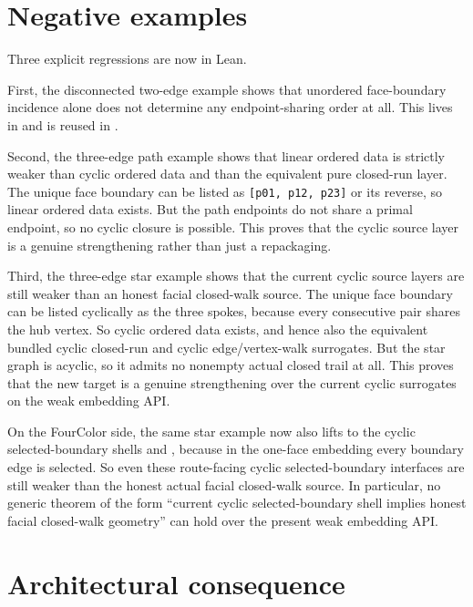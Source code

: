 \documentclass[11pt]{article}
\begin{document}
\section{Negative examples}

Three explicit regressions are now in Lean.

First, the disconnected two-edge example shows that unordered face-boundary
incidence alone does not determine any endpoint-sharing order at all. This lives
in
and is reused in
.

Second, the three-edge path example shows that linear ordered data is strictly
weaker than cyclic ordered data and than the equivalent pure closed-run layer.
The unique face boundary can be listed as \texttt{[p01, p12, p23]} or its
reverse, so linear ordered data exists. But the path endpoints do not share a
primal endpoint, so no cyclic closure is possible. This proves that the cyclic
source layer is a genuine strengthening rather than just a repackaging.

Third, the three-edge star example shows that the current cyclic source layers
are still weaker than an honest facial closed-walk source. The unique face
boundary can be listed cyclically as the three spokes, because every
consecutive pair shares the hub vertex. So cyclic ordered data exists, and
hence also the equivalent bundled cyclic closed-run and cyclic edge/vertex-walk
surrogates. But the star graph is acyclic, so it admits no nonempty actual
closed trail at all. This proves that the new
 target is a genuine strengthening over
the current cyclic surrogates on the weak embedding API.

On the FourColor side, the same star example now also lifts to the cyclic
selected-boundary shells
 and
, because in the one-face
embedding every boundary edge is selected. So even these route-facing cyclic
selected-boundary interfaces are still weaker than the honest actual facial
closed-walk source. In particular, no generic theorem of the form ``current
cyclic selected-boundary shell implies honest facial closed-walk geometry'' can
hold over the present weak embedding API.

\section{Architectural consequence}
\end{document}
